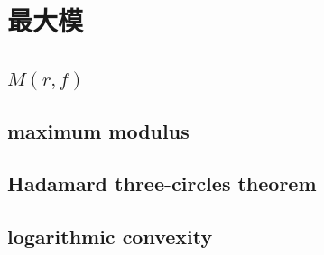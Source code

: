 \section{最大模}
\label{b3:sec:1901}


\subsection{\texorpdfstring{\(M(r,f)\)}{M(r,f)}}
\label{b3:subsec:190101}

\subsection{maximum modulus}
\label{b3:subsec:190102}

\subsection{Hadamard three-circles theorem}
\label{b3:subsec:190103}

\subsection{logarithmic convexity}
\label{b3:subsec:190104}


